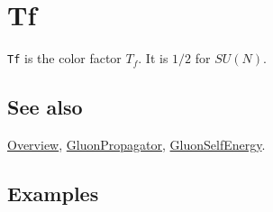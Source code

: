 \documentclass[../FeynCalcManual.tex]{subfiles}
\begin{document}
\hypertarget{tf}{
\section{Tf}\label{tf}}

\texttt{Tf} is the color factor \(T_f\). It is \(1/2\) for \(SU(N)\).

\subsection{See also}

\hyperlink{toc}{Overview}, \hyperlink{gluonpropagator}{GluonPropagator},
\hyperlink{gluonselfenergy}{GluonSelfEnergy}.

\subsection{Examples}
\end{document}
